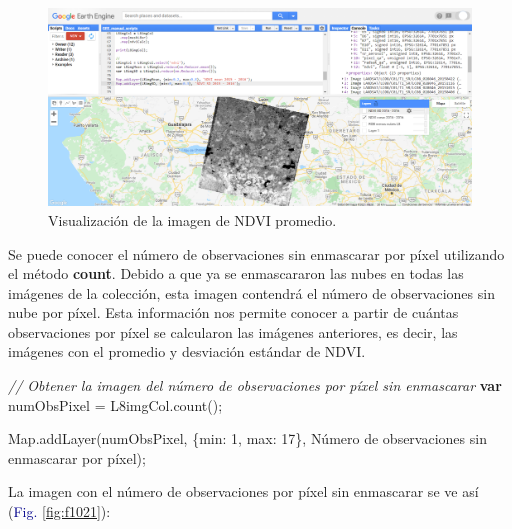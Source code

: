 \documentclass[
  12pt,
  letterpaper,
  twoside]{book}
\newenvironment{Shaded}{\begin{snugshade}}{\end{snugshade}}
\newcommand{\CommentTok}[1]{\textcolor[rgb]{0.24,0.58,0.00}{\textit{#1}}}
\newcommand{\ControlFlowTok}[1]{\textcolor[rgb]{0.00,0.00,0.00}{\textbf{#1}}}
\newcommand{\DataTypeTok}[1]{\textcolor[rgb]{0.00,0.00,0.00}{#1}}
\newcommand{\DecValTok}[1]{\textcolor[rgb]{0.28,0.53,0.93}{#1}}
\newcommand{\FunctionTok}[1]{\textcolor[rgb]{0.48,0.12,0.64}{#1}}
\newcommand{\KeywordTok}[1]{\textcolor[rgb]{0.48,0.12,0.64}{#1}}
\newcommand{\NormalTok}[1]{#1}
\newcommand{\OperatorTok}[1]{\textcolor[rgb]{0.00,0.00,0.00}{#1}}
\newcommand{\StringTok}[1]{\textcolor[rgb]{0.87,0.29,0.22}{#1}}
\newcommand\boldpurple[1]{\textcolor{darkpurple}{\textbf{#1}}}
\begin{document}
\begin{figure}[H]

{\centering \includegraphics[width=0.95\linewidth]{Img/imNDVI} 

}

\caption{Visualización de la imagen de NDVI promedio.}\label{fig:f1020}
\end{figure}

Se puede conocer el número de observaciones sin enmascarar por píxel utilizando el método \boldpurple{count}. Debido a que ya se enmascararon las nubes en todas las imágenes de la colección, esta imagen contendrá el número de observaciones sin nube por píxel. Esta información nos permite conocer a partir de cuántas observaciones por píxel se calcularon las imágenes anteriores, es decir, las imágenes con el promedio y desviación estándar de NDVI.

\begin{Shaded}
\begin{Highlighting}[]
\CommentTok{// Obtener la imagen del número de observaciones por píxel sin enmascarar }
\ControlFlowTok{var}\NormalTok{ numObsPixel }\OperatorTok{=}\NormalTok{ L8imgCol}\OperatorTok{.}\FunctionTok{count}\NormalTok{()}\OperatorTok{;}

\KeywordTok{Map}\OperatorTok{.}\FunctionTok{addLayer}\NormalTok{(numObsPixel}\OperatorTok{,}
\NormalTok{  \{}\DataTypeTok{min}\OperatorTok{:} \DecValTok{1}\OperatorTok{,} \DataTypeTok{max}\OperatorTok{:} \DecValTok{17}\NormalTok{\}}\OperatorTok{,}
  \StringTok{\textquotesingle{}Número de observaciones sin enmascarar por píxel\textquotesingle{}}\NormalTok{)}\OperatorTok{;}
\end{Highlighting}
\end{Shaded}

La imagen con el número de observaciones por píxel sin enmascarar se ve así (\textcolor{darkblue}{Fig.} \ref{fig:f1021}):
\end{document}
